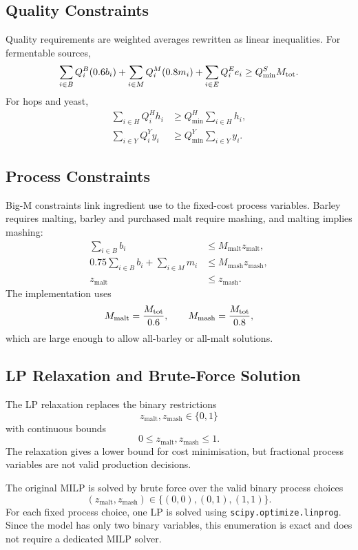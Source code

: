 \subsection{Quality Constraints}
\label{sec:quality-constraints}
Quality requirements are weighted averages rewritten as linear inequalities. For fermentable sources,
\begin{equation}
  \sum_{i \in B} Q^B_i(0.6b_i)
  +\sum_{i \in M} Q^M_i(0.8m_i)
  +\sum_{i \in E} Q^E_i e_i
  \geq Q^S_{\min}M_{\mathrm{tot}}.
  \label{eq:quality-source}
\end{equation}
For hops and yeast,
\begin{align}
  \sum_{i \in H} Q^H_i h_i
  &\geq Q^H_{\min}\sum_{i \in H}h_i, \label{eq:quality-hop}\\
  \sum_{i \in Y} Q^Y_i y_i
  &\geq Q^Y_{\min}\sum_{i \in Y}y_i. \label{eq:quality-yeast}
\end{align}

\subsection{Process Constraints}
\label{sec:process-constraints}
Big-M constraints link ingredient use to the fixed-cost process variables. Barley requires malting, barley and purchased malt require mashing, and malting implies mashing:
\begin{align}
  \sum_{i \in B} b_i
  &\leq M_{\mathrm{malt}} z_{\mathrm{malt}}, \label{eq:link-malt}\\
  0.75\sum_{i \in B} b_i+\sum_{i \in M}m_i
  &\leq M_{\mathrm{mash}} z_{\mathrm{mash}}, \label{eq:link-mash}\\
  z_{\mathrm{malt}} &\leq z_{\mathrm{mash}}. \label{eq:link-logical}
\end{align}
The implementation uses
\begin{equation}
  M_{\mathrm{malt}}=\frac{M_{\mathrm{tot}}}{0.6},\qquad
  M_{\mathrm{mash}}=\frac{M_{\mathrm{tot}}}{0.8},
  \label{eq:bigm-values}
\end{equation}
which are large enough to allow all-barley or all-malt solutions.

\subsection{LP Relaxation and Brute-Force Solution}
\label{sec:relaxation-bruteforce}

The LP relaxation replaces the binary restrictions
\[
  z_{\mathrm{malt}}, z_{\mathrm{mash}} \in \{0,1\}
\]
with continuous bounds
\[
  0 \leq z_{\mathrm{malt}}, z_{\mathrm{mash}} \leq 1.
\]
The relaxation gives a lower bound for cost minimisation, but fractional process variables are not valid production decisions.

The original MILP is solved by brute force over the valid binary process choices
\begin{equation}
  (z_{\mathrm{malt}},z_{\mathrm{mash}})
  \in\{(0,0),(0,1),(1,1)\}.
  \label{eq:bruteforce-set}
\end{equation}
For each fixed process choice, one LP is solved using \texttt{scipy.optimize.linprog}. Since the model has only two binary variables, this enumeration is exact and does not require a dedicated MILP solver.